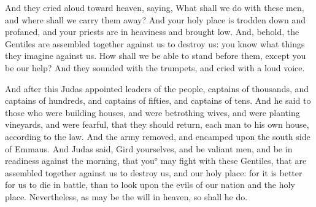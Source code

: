 {And they cried aloud toward heaven, saying, What shall we do with these men, and where shall we carry them away?
And your holy place is trodden down and profaned, and your priests are in heaviness and brought low.
And, behold, the Gentiles are assembled together against us to destroy us: you know what things they imagine against us.
How shall we be able to stand before them, except you be our help?
And they sounded with the trumpets, and cried with a loud voice.
\par }{\PP {}And after this Judas appointed leaders of the people, captains of thousands, and captains of hundreds, and captains of fifties, and captains of tens.
And he said to those who were building houses, and were betrothing wives, and were planting vineyards, and were fearful, that they should return, each man to his own house, according to the law.
And the army removed, and encamped upon the south side of Emmaus.
And Judas said, Gird yourselves, and be valiant men, and be in readiness against the morning, that you° may fight with these Gentiles, that are assembled together against us to destroy us, and our holy place:
for it is better for us to die in battle, than to look upon the evils of our nation and the holy place.
Nevertheless, as may be the will in heaven, so shall he do.

}
